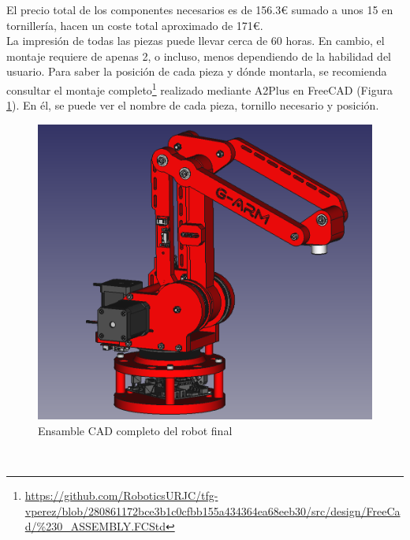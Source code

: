 El precio total de los componentes necesarios es de 156.3\euro{} sumado a unos 15 en tornillería, hacen un coste total aproximado de 171\euro.\\

La impresión de todas las piezas puede llevar cerca de 60 horas. En cambio, 
el montaje requiere de apenas 2, o incluso, menos dependiendo de la habilidad del usuario. Para saber la posición de cada pieza 
y dónde montarla, se recomienda consultar el montaje 
completo\footnote{\url{https://github.com/RoboticsURJC/tfg-vperez/blob/280861172bce3b1c0cfbb155a434364ea68eeb30/src/design/FreeCad/\%230\_ASSEMBLY.FCStd}} 
realizado mediante A2Plus en FreeCAD (Figura \ref{fig:montaje_freeacd_a2plus}). En él, se puede ver 
el nombre de cada pieza, tornillo necesario y posición.
\begin{figure} [h!]
  \begin{center}
    \includegraphics[width=14cm]{figs/montaje.png}
  \end{center}
  \caption{Ensamble CAD completo del robot final}
  \label{fig:montaje_freeacd_a2plus}
  \end{figure}\   

